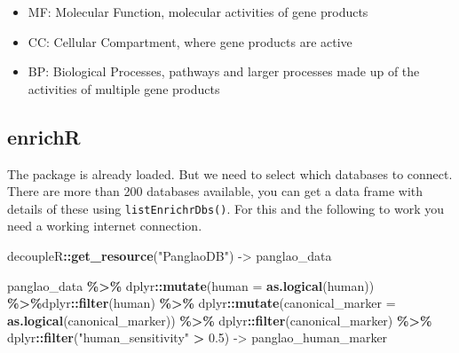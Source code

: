 \documentclass[
]{article}
\newenvironment{Shaded}{\begin{snugshade}}{\end{snugshade}}
\newcommand{\AttributeTok}[1]{\textcolor[rgb]{0.13,0.29,0.53}{#1}}
\newcommand{\FloatTok}[1]{\textcolor[rgb]{0.00,0.00,0.81}{#1}}
\newcommand{\FunctionTok}[1]{\textcolor[rgb]{0.13,0.29,0.53}{\textbf{#1}}}
\newcommand{\NormalTok}[1]{#1}
\newcommand{\OtherTok}[1]{\textcolor[rgb]{0.56,0.35,0.01}{#1}}
\newcommand{\SpecialCharTok}[1]{\textcolor[rgb]{0.81,0.36,0.00}{\textbf{#1}}}
\newcommand{\StringTok}[1]{\textcolor[rgb]{0.31,0.60,0.02}{#1}}
\providecommand{\tightlist}{%
  \setlength{\itemsep}{0pt}\setlength{\parskip}{0pt}}
\begin{document}
\begin{itemize}
\tightlist
\item
  MF: Molecular Function, molecular activities of gene products
\item
  CC: Cellular Compartment, where gene products are active
\item
  BP: Biological Processes, pathways and larger processes made up of the
  activities of multiple gene products
\end{itemize}

\hypertarget{enrichr}{%
\subsection{enrichR}\label{enrichr}}

The package is already loaded. But we need to select which databases to
connect. There are more than 200 databases available, you can get a data
frame with details of these using \texttt{listEnrichrDbs()}. For this
and the following to work you need a working internet connection.

\begin{Shaded}
\begin{Highlighting}[]
\NormalTok{decoupleR}\SpecialCharTok{::}\FunctionTok{get\_resource}\NormalTok{(}\StringTok{"PanglaoDB"}\NormalTok{) }\OtherTok{{-}\textgreater{}}\NormalTok{ panglao\_data}

\NormalTok{panglao\_data }\SpecialCharTok{\%\textgreater{}\%}\NormalTok{ dplyr}\SpecialCharTok{::}\FunctionTok{mutate}\NormalTok{(}\AttributeTok{human =} \FunctionTok{as.logical}\NormalTok{(human)) }\SpecialCharTok{\%\textgreater{}\%}\NormalTok{dplyr}\SpecialCharTok{::}\FunctionTok{filter}\NormalTok{(human) }\SpecialCharTok{\%\textgreater{}\%}\NormalTok{ dplyr}\SpecialCharTok{::}\FunctionTok{mutate}\NormalTok{(}\AttributeTok{canonical\_marker =} \FunctionTok{as.logical}\NormalTok{(canonical\_marker)) }\SpecialCharTok{\%\textgreater{}\%}\NormalTok{ dplyr}\SpecialCharTok{::}\FunctionTok{filter}\NormalTok{(canonical\_marker) }\SpecialCharTok{\%\textgreater{}\%}\NormalTok{ dplyr}\SpecialCharTok{::}\FunctionTok{filter}\NormalTok{(}\StringTok{"human\_sensitivity"} \SpecialCharTok{\textgreater{}} \FloatTok{0.5}\NormalTok{) }\OtherTok{{-}\textgreater{}}\NormalTok{ panglao\_human\_marker}
\end{Highlighting}
\end{Shaded}

\begin{Shaded}
\end{Shaded}
\end{document}
